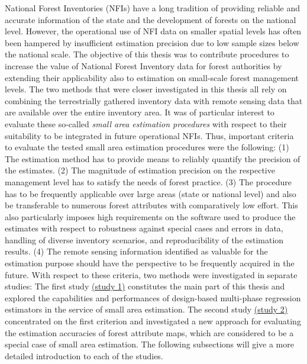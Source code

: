 National Forest Inventories (NFIs) have a long tradition of providing reliable and accurate information of the state and the development of forests on the national level. However, the operational use of NFI data on smaller spatial levels has often been hampered by insufficient estimation precision due to low sample sizes below the national scale. The objective of this thesis was to contribute procedures to increase the value of National Forest Inventory data for forest authorities by extending their applicability also to estimation on small-scale forest management levels. The two methods that were closer investigated in this thesis all rely on combining the terrestrially gathered inventory data with remote sensing data that are available over the entire inventory area. It was of particular interest to evaluate these so-called \textit{small area estimation procedures} with respect to their suitability to be integrated in future operational NFIs. Thus, important criteria to evaluate the tested small area estimation procedures were the following: (1) The estimation method has to provide means to reliably quantify the precision of the estimates. (2) The magnitude of estimation precision on the respective management level has to satisfy the needs of forest practice. (3) The procedure has to be frequently applicable over large areas (state or national level) and also be transferable to numerous forest attributes with comparatively low effort. This also particularly imposes high requirements on the software used to produce the estimates with respect to robustness against special cases and errors in data, handling of diverse inventory scenarios, and reproducibility of the estimation results. (4) The remote sensing information identified as valuable for the estimation purpose should have the perspective to be frequently acquired in the future. With respect to these criteria, two methods were investigated in separate studies: The first study \hyperref[sec:study1]{(study 1)} constitutes the main part of this thesis and explored the capabilities and performances of design-based multi-phase regression estimators in the service of small area estimation. The second study \hyperref[sec:study2]{(study 2)} concentrated on the first criterion and investigated a new approach for evaluating the estimation accuracies of forest attribute maps, which are considered to be a special case of small area estimation. The following subsections will give a more detailed introduction to each of the studies.


